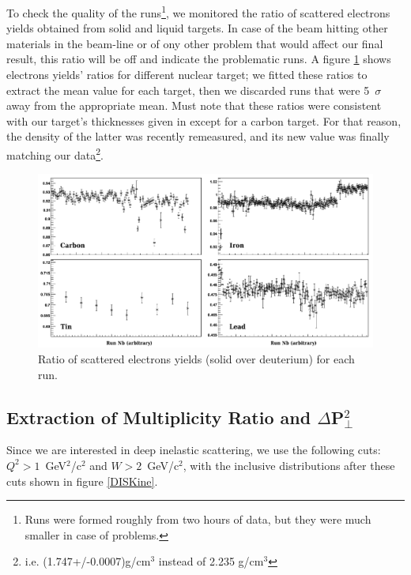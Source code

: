 To check the quality of the runs\footnote{Runs were formed roughly from two hours
of data, but they were much smaller in case of problems.}, we monitored the ratio of scattered electrons yields obtained from solid and liquid targets. In case of the beam hitting other materials in the beam-line or of ony other problem that would affect our final result, 
this ratio will be off and indicate the problematic runs. A figure 
\ref{DataQ} shows electrons yields' ratios for different nuclear target; we fitted these ratios to extract the mean value for each target, then we discarded runs that were 5~$\sigma$ away from the appropriate mean. Must note that these ratios were consistent with our target's thicknesses given in \cite{Hakobyan:2008zz} except for a carbon target. For that reason, the density of the latter was recently remeasured, and its new value was finally matching our data\footnote{i.e. (1.747+/-0.0007)g/cm$^3$ instead of 2.235 g/cm$^3$}.

\begin{figure}[tbp]
\centering
\includegraphics[width=15cm] {chap5-fig/TargetElRatio.png}
\caption {Ratio of scattered electrons yields (solid over deuterium) for each run.}
\label{DataQ}
\end{figure}

\subsection{Extraction of Multiplicity Ratio and $\Delta$P$_\perp^2$}
\label{sec:obs}

Since we are interested in deep inelastic scattering, we use the following 
cuts: $Q^2 > 1$~GeV$^2$/c$^2$ and $W > 2$~GeV/c$^2$, with the inclusive distributions
after these cuts shown in figure \ref{DISKine}.

